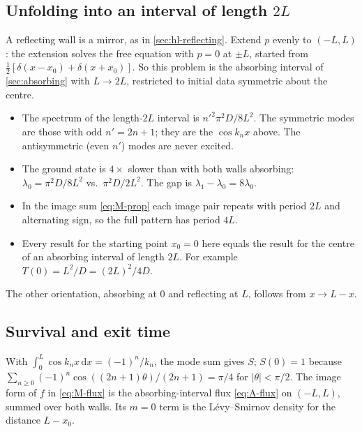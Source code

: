 \documentclass[11pt]{article}
\numberwithin{equation}{section}
\newcommand{\dd}{\mathrm{d}}
\begin{document}
\subsection{Unfolding into an interval of length \texorpdfstring{$2L$}{2L}}

A reflecting wall is a mirror, as in \cref{sec:hl-reflecting}. Extend $p$ evenly to $(-L,L)$: the extension solves the free equation with
$p=0$ at $\pm L$, started from $\tfrac12[\delta(x-x_0)+\delta(x+x_0)]$. So this problem is the absorbing
interval of \cref{sec:absorbing} with $L\to2L$, restricted to initial data symmetric about the centre.
\begin{itemize}
  \item The spectrum of the length-$2L$ interval is $n'^2\pi^2D/8L^2$. The symmetric modes are those with
        odd $n'=2n+1$; they are the $\cos k_nx$ above. The antisymmetric (even $n'$) modes are never excited.
  \item The ground state is $4\times$ slower than with both walls absorbing:
        $\lambda_0=\pi^2D/8L^2$ vs.\ $\pi^2D/2L^2$. The gap is $\lambda_1-\lambda_0=8\lambda_0$.
  \item In the image sum \cref{eq:M-prop} each image pair repeats with period $2L$ and alternating sign, so the
        full pattern has period $4L$.
  \item Every result for the starting point $x_0=0$ here equals the result for the centre of an absorbing
        interval of length $2L$. For example $T(0)=L^2/D=(2L)^2/4D$.
\end{itemize}
The other orientation, absorbing at $0$ and reflecting at $L$, follows from $x\to L-x$.

\subsection{Survival and exit time}

With $\int_0^L\cos k_nx\,\dd x=(-1)^n/k_n$, the mode sum gives $S$; $S(0)=1$ because
$\sum_{n\ge0}(-1)^n\cos((2n+1)\theta)/(2n+1)=\pi/4$ for $|\theta|<\pi/2$. The image form of $f$ in
\cref{eq:M-flux} is the absorbing-interval flux \cref{eq:A-flux} on $(-L,L)$, summed over both walls. Its
$m=0$ term is the L\'evy--Smirnov density for the distance $L-x_0$.
\end{document}
